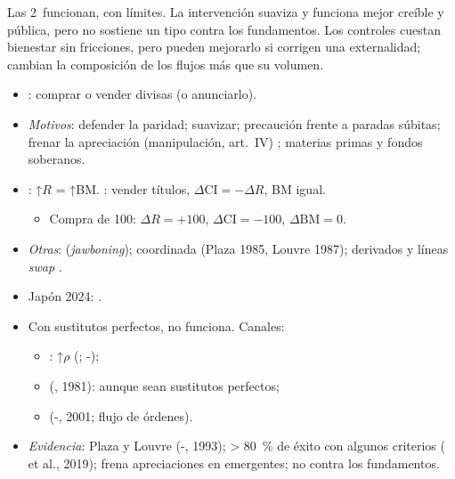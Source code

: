 \documentclass{article}
\begin{document}
\begin{columnas}
\begin{ideaclave}
Las 2~funcionan, con límites. La intervención suaviza y funciona mejor creíble y pública, pero no sostiene un tipo contra los fundamentos. Los controles cuestan bienestar sin fricciones, pero pueden mejorarlo si corrigen una externalidad; cambian la composición de los flujos más que su volumen.
\end{ideaclave}

\begin{itemize}
\item {}: comprar o vender divisas (o anunciarlo).
\item \emph{Motivos}: defender la paridad; suavizar; precaución frente a paradas súbitas; frenar la apreciación (manipulación, art.\ IV) ; materias primas y fondos soberanos.
\item {}: ↑$R$ = ↑BM. : vender títulos, $\Delta\mathrm{CI}=-\Delta R$, BM igual.
  \begin{itemize}
  \item Compra de 100: $\Delta R=+100$, $\Delta\mathrm{CI}=-100$, $\Delta\mathrm{BM}=0$.
  \end{itemize}
\item \emph{Otras}:  (\emph{jawboning}); coordinada (Plaza 1985, Louvre 1987); derivados y líneas \emph{swap} .
\item Japón 2024: .
\end{itemize}
\begin{itemize}
\item Con sustitutos perfectos, no funciona. Canales:
  \begin{itemize}
  \item {}: ↑$\rho$ (; -);
  \item {} (, 1981): aunque sean sustitutos perfectos;
  \item {} (-, 2001; flujo de órdenes).
  \end{itemize}
\item \emph{Evidencia}: Plaza y Louvre (-, 1993); > 80~\% de éxito con algunos criterios ( et al., 2019); frena apreciaciones en emergentes; no contra los fundamentos.

\end{itemize}
\end{columnas}
\end{document}
